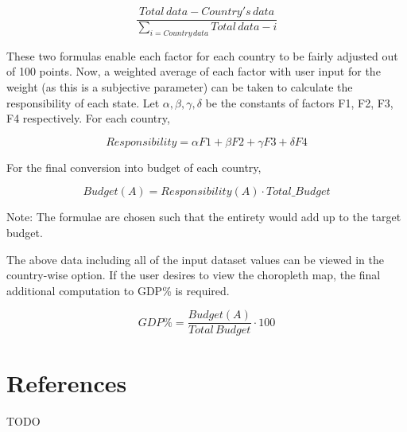\documentclass[fontsize=11pt]{article}
\begin{document}
\[
\frac{Total \, data - Country's \, data}{\displaystyle\sum_{i = Country \, data} Total \, data -  i }
\]

These two formulas enable each factor for each country to be fairly adjusted out of 100 points.
Now, a weighted average of each factor with user input for the weight (as this is a subjective parameter) can be taken
to calculate the responsibility of each state.
Let $\alpha, \beta, \gamma, \delta$ be the constants of factors F1, F2, F3, F4 respectively.
For each country,

\[
 Responsibility = \alpha F1 + \beta F2 + \gamma F3 + \delta F4
\]

For the final conversion into budget of each country,

\[
  Budget(A) = Responsibility(A) \cdot Total \_ Budget
\]

Note: The formulae are chosen such that the entirety would add up to the target budget.\newline

The above data including all of the input dataset values can be viewed in the country-wise option.
If the user desires to view the choropleth map, the final additional computation to GDP\% is required.

\[
  GDP \% = \frac{Budget(A)}{Total \, Budget} \cdot 100
\]





\section*{References}

TODO

\end{document}
